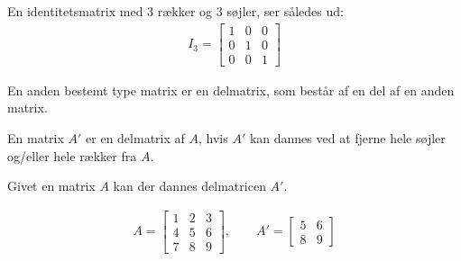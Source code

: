 En identitetsmatrix med $3$ rækker og $3$ søjler, ser således ud:
\begin{align*}
I_3 = \begin{bmatrix}
	1 & 0 & 0 \\
	0 & 1 & 0 \\
	0 & 0 & 1 
\end{bmatrix}
\end{align*}

En anden bestemt type matrix er en delmatrix, som består af en del af en anden matrix.
\begin{defn} [Delmatrix]
En matrix $A'$ er en delmatrix af $A$, hvis $A'$ kan dannes ved at fjerne hele søjler og/eller hele rækker fra $A$.
\label{delmatrix}
\end{defn}

Givet en matrix $A$ kan der dannes delmatricen $A'$.

\begin{align*}
A = \begin{bmatrix}
	1 & 2 & 3 \\
	4 & 5 & 6 \\
	7 & 8 & 9 
\end{bmatrix}, \quad \quad
A' = \begin{bmatrix}
	5 & 6 \\
	8 & 9
\end{bmatrix}
\end{align*}

